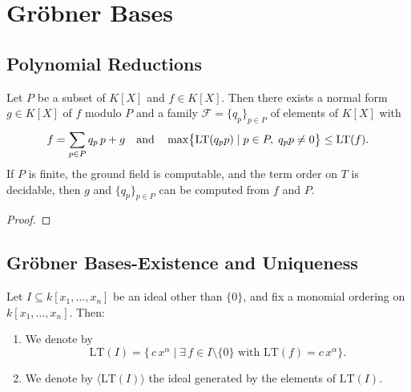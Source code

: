 \chapter{Gr{\"o}bner Bases} 

\section{Polynomial Reductions}

\begin{theorem}
\label{thm:div_alg}
  \leanok
  Let $P$ be a subset of $K[X]$ and $f\in K[X]$.
  Then there exists a normal form $g\in K[X]$ of $f$ modulo $P$ and a family $\mathcal{F}=\{q_{p}\}_{p\in P}$ of elements of $K[X]$ with
  \[
    f=\sum_{p\in P}q_{p}\,p + g
    \quad\text{and}\quad
    \max\bigl\{\operatorname{LT}(q_{p}p)\mid p\in P,\;q_{p}p\neq 0\bigr\}\le \operatorname{LT}(f).
  \]
  If $P$ is finite, the ground field is computable, and the term order on $T$ is decidable, 
  then $g$ and $\{q_{p}\}_{p\in P}$ can be computed from $f$ and $P$.
\end{theorem}
\begin{proof}
  \leanok %
\end{proof}

\section{Gr{\"o}bner Bases-Existence and Uniqueness}

\begin{definition}
  \label{def:initialIdeal}
  \leanok %
  Let \(I\subseteq k[x_1,\dots,x_n]\) be an ideal other than \(\{0\}\), and fix a monomial ordering on \(k[x_1,\dots,x_n]\).  Then:
  \begin{enumerate}
    \item We denote by
    \[
      \mathrm{LT}(I)
      =
      \{\,c\,x^\alpha \mid \exists\,f\in I\setminus\{0\}\text{ with }\mathrm{LT}(f)=c\,x^\alpha\}.
    \]
    \item We denote by \(\langle \mathrm{LT}(I)\rangle\) the ideal generated by the elements of \(\mathrm{LT}(I)\).
  \end{enumerate}
\end{definition}

